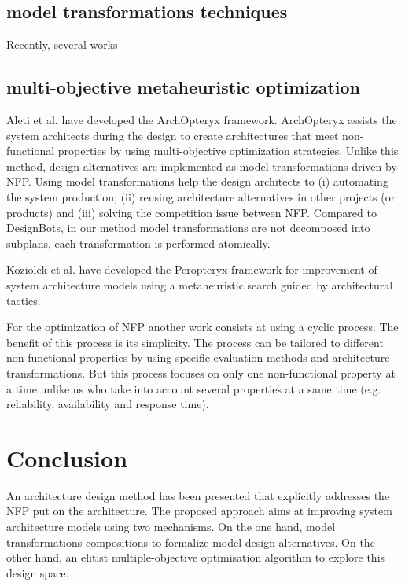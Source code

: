 \documentclass[conference]{IEEEtran}
\begin{document}
\subsection{model transformations techniques}
Recently, several works 

\subsection{multi-objective metaheuristic optimization}
Aleti et al.\cite{Gr5069138} have developed the ArchOpteryx framework. ArchOpteryx assists the system architects during the design to create architectures that meet non-functional properties by using multi-objective optimization strategies. Unlike this method, design alternatives are implemented as model transformations driven by NFP. Using model transformations help the design architects to (i) automating the system production; (ii) reusing architecture alternatives in other projects (or products) and (iii) solving the competition issue between NFP. Compared to DesignBots\cite{Diaz-Pace:2007:UPT:1784860.1784865}, in our method model transformations are not decomposed into subplans, each transformation is performed atomically.

Koziolek et al.\cite{Koziolek:2011:PAA:2000259.2000267} have developed the Peropteryx framework for improvement of system architecture models using a metaheuristic search guided by architectural tactics.

For the optimization of NFP another work consists at using a cyclic process\cite{Bosch99softwarearchitecture}. The benefit of this process is its simplicity. The process can be tailored to different non-functional properties by using specific evaluation methods and architecture transformations. But this process focuses on only one non-functional property at a time unlike us who take into account several properties at a same time (e.g. reliability, availability and response time).

\section{Conclusion}
\label{Conclu}
An architecture design method has been presented that explicitly addresses the NFP put on the architecture. The proposed approach aims at improving system architecture models using two mechanisms. On the one hand, model transformations compositions to formalize model design alternatives. On the other hand, an elitist multiple-objective optimisation algorithm to explore this design space.
\end{document}
